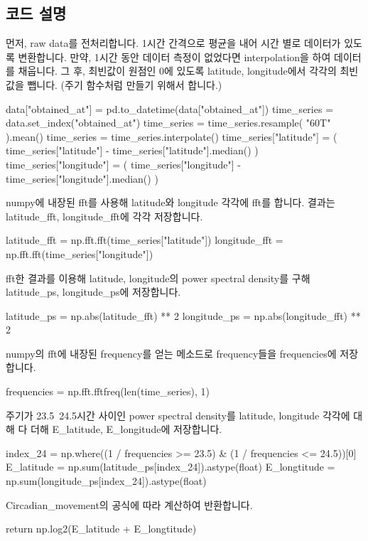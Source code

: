 \documentclass{oblivoir}
\begin{document}
  \subsection{코드 설명}
  먼저, raw data를 전처리합니다. 1시간 간격으로 평균을 내어 시간 별로 데이터가 있도록 변환합니다.
  만약, 1시간 동안 데이터 측정이 없었다면 interpolation을 하여 데이터를 채웁니다.
  그 후, 최빈값이 원점인 0에 있도록 latitude, longitude에서 각각의 최빈값을 뺍니다.
  (주기 함수처럼 만들기 위해서 합니다.)
  \begin{python}[label={GPS_feature_36}]
    data["obtained_at"] = pd.to_datetime(data["obtained_at"])
    time_series = data.set_index("obtained_at")
    time_series = time_series.resample(
        "60T"
    ).mean()
    time_series = time_series.interpolate()
    time_series["latitude"] = (
        time_series["latitude"] - time_series["latitude"].median()
    )
    time_series["longitude"] = (
        time_series["longitude"] - time_series["longitude"].median()
    )
  \end{python}
  numpy에 내장된 fft를 사용해 latitude와 longitude 각각에 fft를 합니다.
  결과는 latitude\_fft, longitude\_fft에 각각 저장합니다.
  \begin{python}[label={GPS_feature_37}]
    latitude_fft = np.fft.fft(time_series["latitude"])
    longitude_fft = np.fft.fft(time_series["longitude"])
  \end{python}
  fft한 결과를 이용해 latitude, longitude의 power spectral density를 구해 latitude\_ps, longitude\_ps에 저장합니다.
  \begin{python}[label={GPS_feature_38}]
    latitude_ps = np.abs(latitude_fft) ** 2
    longitude_ps = np.abs(longitude_fft) ** 2
  \end{python}
  numpy의 fft에 내장된 frequency를 얻는 메소드로 frequency들을 frequencies에 저장합니다.
  \begin{python}[label={GPS_feature_39}]
    frequencies = np.fft.fftfreq(len(time_series), 1)
  \end{python}
  주기가 23.5~24.5시간 사이인 power spectral density를 latitude, longitude 각각에 대해 다 더해 E\_latitude, E\_longitude에 저장합니다.
  \begin{python}[label={GPS_feature_40}]
    index_24 = np.where((1 / frequencies >= 23.5) & (1 / frequencies <= 24.5))[0]
    E_latitude = np.sum(latitude_ps[index_24]).astype(float)
    E_longtitude = np.sum(longitude_ps[index_24]).astype(float)
  \end{python}
  Circadian\_movement의 공식에 따라 계산하여 반환합니다.
  \begin{python}[label={GPS_feature_41}]
    return np.log2(E_latitude + E_longtitude)
  \end{python}
\end{document}
